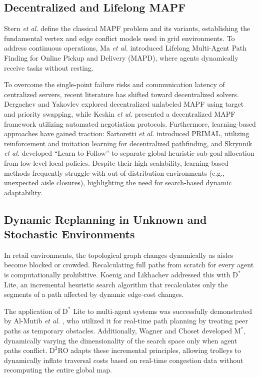 \documentclass[journal]{IEEEtran}
\begin{document}
\subsection{Decentralized and Lifelong MAPF}
\label{sec:rel_mapf}
Stern \textit{et al.} \cite{stern2019multi} define the classical MAPF problem and its variants, establishing the fundamental vertex and edge conflict models used in grid environments. To address continuous operations, Ma \textit{et al.} \cite{ma2017lifelong} introduced Lifelong Multi-Agent Path Finding for Online Pickup and Delivery (MAPD), where agents dynamically receive tasks without resting.

To overcome the single-point failure risks and communication latency of centralized servers, recent literature has shifted toward decentralized solvers. Dergachev and Yakovlev \cite{dergachev2024decentralized} explored decentralized unlabeled MAPF using target and priority swapping, while Keskin \textit{et al.} \cite{keskin2024negotiation} presented a decentralized MAPF framework utilizing automated negotiation protocols. Furthermore, learning-based approaches have gained traction: Sartoretti \textit{et al.} \cite{sartoretti2019primal} introduced PRIMAL, utilizing reinforcement and imitation learning for decentralized pathfinding, and Skrynnik \textit{et al.} \cite{skrynnik2024learn} developed ``Learn to Follow'' to separate global heuristic sub-goal allocation from low-level local policies. Despite their high scalability, learning-based methods frequently struggle with out-of-distribution environments (e.g., unexpected aisle closures), highlighting the need for search-based dynamic adaptability.

\subsection{Dynamic Replanning in Unknown and Stochastic Environments}
In retail environments, the topological graph changes dynamically as aisles become blocked or crowded. Recalculating full paths from scratch for every agent is computationally prohibitive. Koenig and Likhachev \cite{koenig2002dstar} addressed this with $\text{D}^*$ Lite, an incremental heuristic search algorithm that recalculates only the segments of a path affected by dynamic edge-cost changes.

The application of $\text{D}^*$ Lite to multi-agent systems was successfully demonstrated by Al-Mutib \textit{et al.} \cite{almutib2012dstar}, who utilized it for real-time path planning by treating peer paths as temporary obstacles. Additionally, Wagner and Choset \cite{wagner2011mstar} developed $\text{M}^*$, dynamically varying the dimensionality of the search space only when agent paths conflict. $\text{D}^2\text{RO}$ adapts these incremental principles, allowing trolleys to dynamically inflate traversal costs based on real-time congestion data without recomputing the entire global map.
\end{document}

